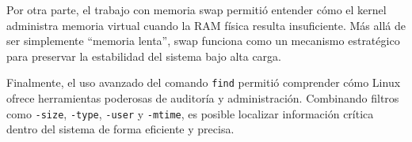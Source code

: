 \documentclass[11pt, letterpaper]{article}
\begin{document}
Por otra parte, el trabajo con memoria swap permitió entender cómo el kernel administra memoria virtual cuando la RAM física resulta insuficiente. Más allá de ser simplemente “memoria lenta”, swap funciona como un mecanismo estratégico para preservar la estabilidad del sistema bajo alta carga.

Finalmente, el uso avanzado del comando \texttt{find} permitió comprender cómo Linux ofrece herramientas poderosas de auditoría y administración. Combinando filtros como \texttt{-size}, \texttt{-type}, \texttt{-user} y \texttt{-mtime}, es posible localizar información crítica dentro del sistema de forma eficiente y precisa.
\end{document}
